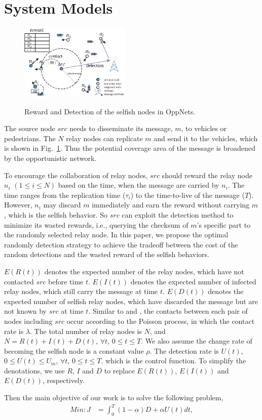 \section{System Models}
\label{sec:sys_model}
\begin{figure}
  \centering
  {\includegraphics[width=0.47\textwidth]{fig/sketch.eps}}
     \caption{Reward and Detection of the selfish nodes in OppNets.}
     \label{fig:sketch}
\end{figure}
The source node $src$ needs to disseminate its message, $m$,
to vehicles or pedestrians.
The $N$ relay nodes can replicate $m$
and send it to the vehicles,
which is shown in Fig.~\ref{fig:sketch}.
Thus the potential coverage area of the message is broadened 
by the opportunistic network.

To encourage the collaboration of relay nodes,
$src$ should reward the relay node $n_{i}$ 
$(1 \le i \le N)$ based on the time,
when the message are carried by $n_{i}$.
The time ranges from the replication time ($\tau_{i}$)
to the time-to-live of the message ($T$).
However, $n_{i}$ may discard $m$ immediately
and earn the reward without carrying $m$,
which is the selfish behavior.
So $src$ can exploit the detection method to minimize its wasted rewards,
i.e., querying the checksum of $m$'s specific part
to the randomly selected relay node.
In this paper, we propose the optimal randomly detection strategy
to achieve the tradeoff between
the cost of the random detections and 
the wasted reward of the selfish behaviors.

$E(R(t))$ denotes the expected number of the relay nodes,
which have not contacted $src$ before time $t$.
$E(I(t))$ denotes the expected number of infected relay nodes,
which still carry the message at time $t$.
$E(D(t))$ denotes the expected number of selfish relay nodes,
which have discarded the message but are not known by $src$
at time $t$.
Similar to \cite{TCSS2018ControlM} and \cite{CC2007PerfAnaly},
the contacts between each pair of nodes including $src$
occur according to the Poisson process,
in which the contact rate is $\lambda$.
The total number of relay nodes is $N$,
and $N=R(t)+I(t)+D(t)$, $\forall t$, $0 \le t \le T$.
We also assume the change rate of 
becoming the selfish node is a constant value $\rho$.
The detection rate is $U(t)$,
$0 \le U(t) \le U_{m}$, $\forall t$, $0 \le t \le T$.
which is the control function.
To simplify the denotations,
we use $R$, $I$ and $D$ to 
replace $E(R(t))$, $E(I(t))$ and $E(D(t))$,
respectively.

Then the main objective of our work is to solve the
following problem,
\begin{equation}
\nonumber
\begin{aligned}
Min: J &= \int_{0}^{T} (1-\alpha) D + \alpha U(t) dt ,
\end{aligned}
\end{equation}
